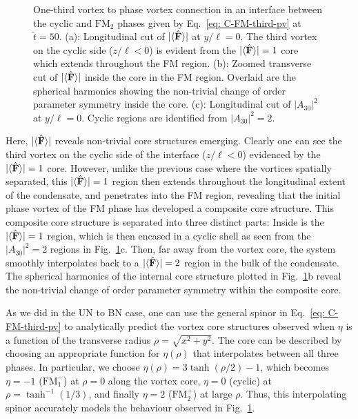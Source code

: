 \begin{figure}
    \caption[Dynamics of a one-third vortex to singly quantised vortex
    connection in a cyclic to ferromagnetic interface]
    {\label{fig: C-FM-third-SQV}One-third vortex to phase vortex connection in
    an interface between the cyclic and \(\text{FM}_2\) phases given by
    Eq.~\eqref{eq: C-FM-third-pv} at \(\tilde{t} = 50\).
    (a): Longitudinal cut of \(|\langle \hat{\vb{F}} \rangle | \) at \(y/\ell=0\).
    The third vortex on the cyclic side (\(z/\ell < 0\)) is evident from the
    \(|\langle \hat{\vb{F}} \rangle | = 1\) core which extends throughout the FM region.
    (b): Zoomed transverse cut of \(|\langle \hat{\vb{F}} \rangle | \) inside the core in the FM
    region.
    Overlaid are the spherical harmonics showing the non-trivial change
    of order parameter symmetry inside the core.
    (c): Longitudinal cut of \(|A_{30}|^2\) at \(y/\ell=0\).
    Cyclic regions are identified from \(|A_{30}|^2=2\).}
\end{figure}
Here, \(|\langle \hat{\vb{F}} \rangle | \) reveals non-trivial core structures emerging.
Clearly one can see the third vortex on the cyclic side of the interface
(\(z/\ell < 0\)) evidenced by the \(|\langle \hat{\vb{F}} \rangle | = 1\) core.
However, unlike the previous case where the vortices spatially separated, this
\(|\langle \hat{\vb{F}} \rangle | = 1\) region then extends throughout the longitudinal extent of the
condensate, and penetrates into the FM region, revealing that the initial phase
vortex of the FM phase has developed a composite core structure.
This composite core structure is separated into three distinct parts:
Inside is the \(|\langle \hat{\vb{F}} \rangle | = 1\) region, which is then encased in a cyclic shell
as seen from the \(|A_{30}|^2=2\) regions in Fig.~\ref{fig: C-FM-third-SQV}c.
Then, far away from the vortex core, the system smoothly interpolates back to
a \(|\langle \hat{\vb{F}} \rangle | = 2\) region in the bulk of the condensate.
The spherical harmonics of the internal core structure plotted in
Fig.~\ref{fig: C-FM-third-SQV}b reveal the non-trivial change of order parameter
symmetry within the composite core.

As we did in the UN to BN case, one can use the general spinor in
Eq.~\eqref{eq: C-FM-third-pv} to analytically predict the vortex core structures
observed when \(\eta \) is a function of the transverse radius
\(\rho = \sqrt{x^2 + y^2}\).
The core can be described by choosing an appropriate function for
\(\eta(\rho)\) that interpolates between all three phases.
In particular, we choose \(\eta(\rho) = 3\tanh(\rho/2) - 1\), which becomes
\(\eta=-1\) (\(\text{FM}_1^-\)) at \(\rho=0\) along the vortex core, \(\eta=0\)
(cyclic) at \(\rho=\tanh^{-1}(1/3)\), and finally \(\eta=2\) (\(\text{FM}_2^+\))
at large \(\rho \).
Thus, this interpolating spinor accurately models the behaviour observed in
Fig.~\ref{fig: C-FM-third-SQV}.

